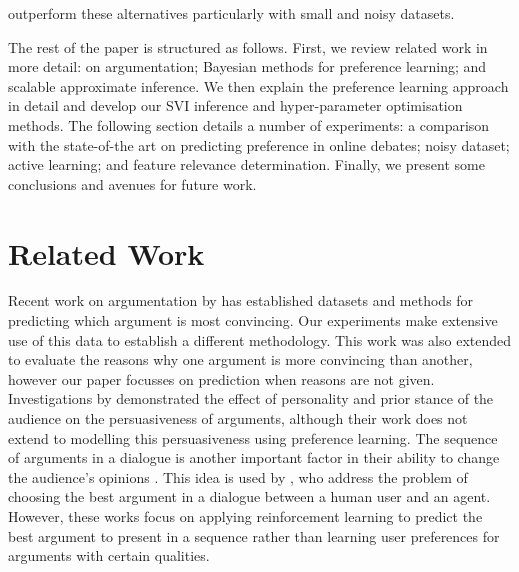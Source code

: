 outperform these alternatives particularly with small and noisy datasets. 

The rest of the paper is structured as follows.
First, we review related work in more detail: on argumentation; Bayesian methods for preference learning; and scalable approximate inference.
We then explain the preference learning approach in detail and develop our SVI inference  and hyper-parameter optimisation methods.
The following section details a number of experiments: a comparison with the
state-of-the art on predicting preference in online debates; 
noisy dataset; active learning; and feature relevance determination.
Finally, we present some conclusions and avenues for future work.

\section{Related Work}\label{sec:related}

Recent work on argumentation by \cite{habernal2016argument} has established datasets and methods for
predicting which argument is most convincing. Our experiments make extensive use of this data to establish
a different methodology. This work was also extended to evaluate the reasons why one argument
is more convincing than another\cite{habernal2016makes}, however our paper focusses on prediction when reasons are not given. 
Investigations by \cite{lukin2017argument} demonstrated the effect of personality and prior stance 
of the audience on the persuasiveness of arguments,
although their work does not extend to modelling this persuasiveness using preference learning.
The sequence of arguments in a dialogue is another important factor in their ability to change
the audience's opinions \cite{tan2016winning}.
This idea is used by \cite{rosenfeld2016providing,monteserin2013reinforcement}, 
who address the problem of choosing the best argument in a dialogue between a human user and an agent. 
However, these works focus on applying  reinforcement learning to predict the best argument 
to present in a sequence rather than learning user preferences for arguments with certain qualities.
 
